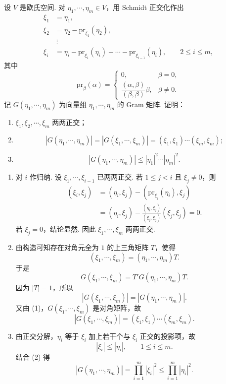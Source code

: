 \begin{problem}\label{39}

	设 $V$ 是欧氏空间. 对 $\eta_1,\cdots,\eta_m\in V$，用 Schmidt 正交化作出
	\[
	\begin{aligned}
		\xi_1&=\eta_1,\\
		\xi_2&=\eta_2-\mathrm{pr}_{\xi_1}(\eta_2),\\
		&\ \vdots\\
		\xi_i&=\eta_i-\mathrm{pr}_{\xi_1}(\eta_i)-\cdots-\mathrm{pr}_{\xi_{i-1}}(\eta_i),
		\qquad 2\leqslant i\leqslant m,
	\end{aligned}
	\]
	其中
	\[
	\mathrm{pr}_{\beta}(\alpha)=
	\begin{cases}
		0, & \beta=0,\\[2mm]
		\dfrac{(\alpha,\beta)}{(\beta,\beta)}\beta, & \beta\ne0.
	\end{cases}
	\]
	记 $G(\eta_1,\cdots,\eta_m)$ 为向量组 $\eta_1,\cdots,\eta_m$ 的 Gram 矩阵. 证明：
	\begin{enumerate}
		\item $\xi_1,\xi_2,\cdots,\xi_m$ 两两正交；
		\item
		\[
		|G(\eta_1,\cdots,\eta_m)|=|G(\xi_1,\cdots,\xi_m)|=(\xi_1,\xi_1)\cdots(\xi_m,\xi_m);
		\]
		\item
		\[
		|G(\eta_1,\cdots,\eta_m)|\leqslant |\eta_1|^2\cdots |\eta_m|^2.
		\]
	\end{enumerate}
\end{problem}
\begin{solution}
	\begin{enumerate}
		\item 对 $i$ 作归纳. 设 $\xi_1,\cdots,\xi_{i-1}$ 已两两正交. 若 $1\leqslant j<i$ 且 $\xi_j\ne0$，则
		\[
		\begin{aligned}
			(\xi_i,\xi_j)
			&=(\eta_i,\xi_j)-\left(\mathrm{pr}_{\xi_j}(\eta_i),\xi_j\right) \\
			&=(\eta_i,\xi_j)-\frac{(\eta_i,\xi_j)}{(\xi_j,\xi_j)}(\xi_j,\xi_j)=0.
		\end{aligned}
		\]
		若 $\xi_j=0$，结论显然. 因此 $\xi_1,\cdots,\xi_m$ 两两正交.
		\item 由构造可知存在对角元全为 $1$ 的上三角矩阵 $T$，使得
		\[
		(\xi_1,\cdots,\xi_m)=(\eta_1,\cdots,\eta_m)T.
		\]
		于是
		\[
		G(\xi_1,\cdots,\xi_m)=T'G(\eta_1,\cdots,\eta_m)T.
		\]
		因为 $|T|=1$，所以
		\[
		|G(\xi_1,\cdots,\xi_m)|=|G(\eta_1,\cdots,\eta_m)|.
		\]
		又由 (1)，$G(\xi_1,\cdots,\xi_m)$ 是对角矩阵，故
		\[
		|G(\xi_1,\cdots,\xi_m)|=(\xi_1,\xi_1)\cdots(\xi_m,\xi_m).
		\]
		\item 由正交分解，$\eta_i$ 等于 $\xi_i$ 加上若干个与 $\xi_i$ 正交的投影项，故
		\[
		|\xi_i|\leqslant |\eta_i|,
		\qquad 1\leqslant i\leqslant m.
		\]
		结合 (2) 得
		\[
		|G(\eta_1,\cdots,\eta_m)|=\prod_{i=1}^m|\xi_i|^2
		\leqslant \prod_{i=1}^m|\eta_i|^2.
		\]
	\end{enumerate}
\end{solution}

